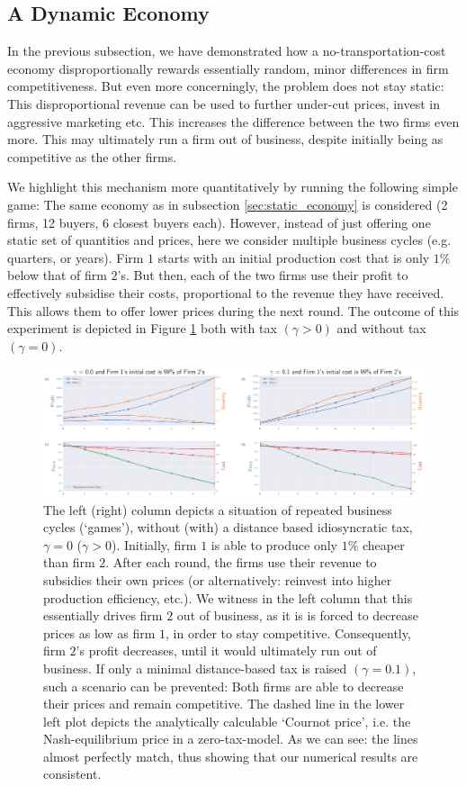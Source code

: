 \documentclass[final,3p,times,authoryear,12pt]{elsarticle}
\begin{document}
\subsection{A Dynamic Economy} 
\label{sec:dynamic}

In the previous subsection, we have demonstrated how a no-transportation-cost economy disproportionally rewards essentially random, minor differences in firm competitiveness. 
But even more concerningly, the problem does not stay static: 
This disproportional revenue can be used to further under-cut prices, invest in aggressive marketing etc. 
This increases the difference between the two firms even more. 
This may ultimately run a firm out of business, despite initially being as competitive as the other firms. 

We highlight this mechanism more quantitatively by running the following simple game:
The same economy as in subsection \ref{sec:static_economy} is considered (2 firms, 12 buyers, 6 closest buyers each). 
However, instead of just offering one static set of quantities and prices, here we consider multiple business cycles (e.g. quarters, or years). 
Firm $1$ starts with an initial production cost that is only $1\%$ below that of firm $2$'s. 
But then, each of the two firms use their profit to effectively subsidise their costs, proportional to the revenue they have received. 
This allows them to offer lower prices during the next round. 
The outcome of this experiment is depicted in Figure \ref{fig:dynamic_game} both with tax $(\gamma > 0)$ and without tax $(\gamma=0)$. 
\begin{figure}[!htb]
	\centering
	\includegraphics[width=\textwidth]{dynamic_game}
	\caption{	The left (right) column depicts a situation of repeated business cycles (`games'), without (with) a distance based idiosyncratic tax, $\gamma=0$ ($\gamma > 0$). 
			Initially, firm $1$ is able to produce only $1\%$ cheaper than firm $2$. 
			After each round, the firms use their revenue to subsidies their own prices (or alternatively: reinvest into higher production efficiency, etc.). 
			We witness in the left column that this essentially drives firm $2$ out of business, as it is is forced to decrease prices as low as firm $1$, in order to stay competitive. 
			Consequently,  firm $2$'s  profit decreases, until it would ultimately run out of business.
			If only a minimal distance-based tax is raised $(\gamma=0.1)$, such a scenario can be prevented: 
			Both firms are able to decrease their prices and remain competitive. 
			The dashed line in the lower left plot depicts the analytically calculable `Cournot price', i.e. the Nash-equilibrium price in a zero-tax-model.
			As we can see: the lines almost perfectly match, thus showing that our numerical results are consistent. 
			}
	\label{fig:dynamic_game}
\end{figure}
\end{document}
